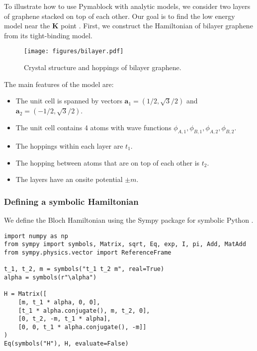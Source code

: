 
To illustrate how to use Pymablock with analytic models, we consider two layers
of graphene stacked on top of each other.
Our goal is to find the low energy model near the $\mathbf{K}$ point
\cite{McCann_2013}.
First, we construct the Hamiltonian of bilayer graphene from its tight-binding
model.

\begin{figure}[!htbp]
\centering
\texttt{[image: figures/bilayer.pdf]}
\caption[]{Crystal structure and hoppings of bilayer graphene.}
\label{bilayer}
\end{figure}

The main features of the model are:
%
\begin{itemize}
\item The unit cell is spanned by vectors $\mathbf{a}_1 = (1/2, \sqrt{3}/2)$ and $\mathbf{a}_2=( -1/2, \sqrt{3}/2)$.
\item The unit cell contains 4 atoms with wave functions $\phi_{A,1}, \phi_{B,1}, \phi_{A,2}, \phi_{B,2}$.
\item The hoppings within each layer are $t_1$.
\item The hopping between atoms that are on top of each other is $t_2$.
\item The layers have an onsite potential $\pm m$.
\end{itemize}

\subsubsection{Defining a symbolic Hamiltonian}

We define the Bloch Hamiltonian using the Sympy package for symbolic Python
\cite{Meurer_2017}.
%
\begin{verbatim}
import numpy as np
from sympy import symbols, Matrix, sqrt, Eq, exp, I, pi, Add, MatAdd
from sympy.physics.vector import ReferenceFrame

t_1, t_2, m = symbols("t_1 t_2 m", real=True)
alpha = symbols(r"\alpha")

H = Matrix([
    [m, t_1 * alpha, 0, 0],
    [t_1 * alpha.conjugate(), m, t_2, 0],
    [0, t_2, -m, t_1 * alpha],
    [0, 0, t_1 * alpha.conjugate(), -m]]
)
Eq(symbols("H"), H, evaluate=False)
\end{verbatim}

